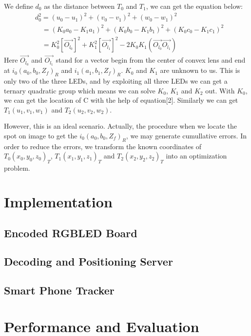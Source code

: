 \documentclass[conference]{IEEEtran}
\begin{document}
We define $d_0$ as the distance between $T_0$ and $T_1$, we can get the equation below:
	\begin{equation}
	\begin{split}
		&d_0^2 = (u_0 - u_1)^2 + (v_0 - v_1)^2 + (w_0 - w_1)^2  \\
		& \quad   =(K_0a_0-K_1a_1)^2 + (K_0b_0-K_1b_1)^2 +(K_0c_0-K_1c_1)^2  \\
		& \quad   =K_0^2[\vec{O_{l_0}}]^2 + K_1^2[\vec{O_{l_1}}]^2 - 2K_0K_1(\vec{O_{l_0}}\vec{O_{l_1}})
	\end{split}
	\end{equation}
Here $\vec{O_{l_0}}$ and $\vec{O_{l_1}}$ stand for a vector begin from the center of convex lens and end at $i_0(a_0, b_0, Z_f)_R$ and $i_1(a_1, b_1, Z_f)_R$. $K_0$ and $K_1$ are unknown to us. This is only two of the three LEDs, and by exploiting all three LEDs we can get a ternary quadratic group which means we can solve $K_0$, $K_1$ and $K_2$ out. With $K_0$, we can get the location of C with the help of equation[2]. Similarly we can get $T_1(u_1,v_1,w_1)$ and $T_2(u_2,v_2,w_2)$. 

However, this is an ideal scenario. Actually, the procedure when we locate the spot on image to get the $i_0(a_0, b_0, Z_f)_R$, we may generate cumullative errors. In order to reduce the errors, we transform the known coordinates of $T_0(x_0,y_0,z_0)_T$,  $T_1(x_1,y_1,z_1)_T$ and  $T_2(x_2,y_2,z_2)_T$ into an optimization problem.
\section{Implementation}
\subsection{Encoded RGBLED Board}
\subsection{Decoding and Positioning Server}
\subsection{Smart Phone Tracker}

\section{Performance and Evaluation}
\end{document}
